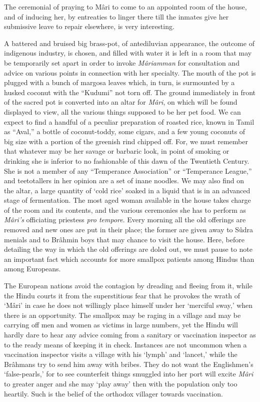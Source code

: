 \documentclass[a4paper, 12pt, oneside, english, twocolumn]{article}
\begin{document}
The ceremonial of praying to Mâri to come to an appointed room of the house, and of inducing her, by entreaties to linger there till the inmates give her submissive leave to repair elsewhere, is very interesting.

A battered and bruised big brass-pot, of antediluvian appearance, the outcome of indigenous industry, is chosen, and filled with water it is left in a room that may be temporarily set apart in order to invoke \emph{Mâriamman} for consultation and advice on various points in connection with her specialty. The mouth of the pot is plugged with a bunch of margosa leaves which, in turn, is surmounted by a husked coconut with the ``Kudumi'' not torn off. The ground immediately in front of the sacred pot is converted into an altar for \emph{Mâri}, on which will be found displayed to view, all the various things supposed to be her pet food. We can expect to find a handful of a peculiar preparation of roasted rice, known in Tamil as ``Aval,'' a bottle of coconut-toddy, some cigars, and a few young coconuts of big size with a portion of the greenish rind chipped off. For, we must remember that whatever may be her savage or barbaric look, in point of smoking or drinking she is inferior to no fashionable of this dawn of the Twentieth Century. She is not a member of any ``Temperance Association'' or ``Temperance League,'' and teetotallers in her opinion are a set of inane noodles. We may also find on the altar, a large quantity of `cold rice' soaked in a liquid that is in an advanced stage of fermentation. The most aged woman available in the house takes charge of the room and its contents, and the various ceremonies she has to perform as \emph{Mâri's} officiating priestess \emph{pro tempore}. Every morning all the old offerings are removed and new ones are put in their place; the former are given away to Sûdra menials and to Brâhmin boys that may chance to visit the house. Here, before detailing the way in which the old offerings are doled out, we must pause to note an important fact which accounts for more smallpox patients among Hindus than among Europeans.

The European nations avoid the contagion by dreading and fleeing from it, while the Hindu courts it from the superstitious fear that he provokes the wrath of `Mâri' in case he does not willingly place himself under her `merciful sway,' when there is an opportunity. The smallpox may be raging in a village and may be carrying off men and women as victims in large numbers, yet the Hindu will hardly dare to hear any advice coming from a sanitary or vaccination inspector as to the ready means of keeping it in check. Instances are not uncommon when a vaccination inspector visits a village with his `lymph' and `lancet,' while the Brâhmans try to send him away with bribes. They do not want the Englishmen's `false-pearls,' for to see counterfeit things smuggled into her port will excite \emph{Mâri} to greater anger and she may `play away' then with the population only too heartily. Such is the belief of the orthodox villager towards vaccination.
\end{document}
